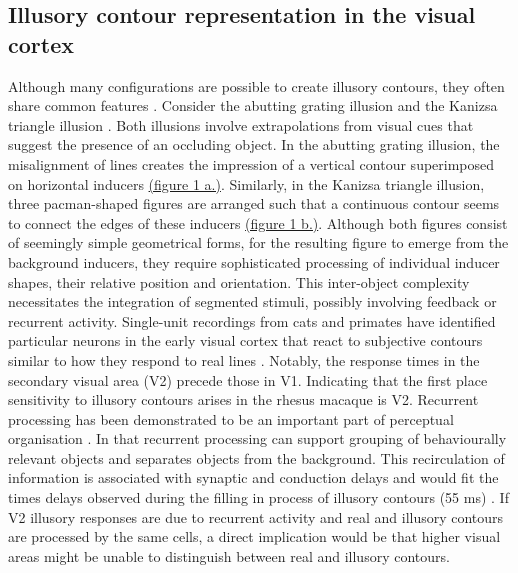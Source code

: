 \documentclass[12pt]{article}
\begin{document}
\subsection{Illusory contour representation in the visual cortex}
Although many configurations are possible to create illusory contours, they often share common features \autocite{palmerLateInfluencesPerceptual2000}. Consider the abutting grating illusion \autocite{sorianoAbuttingGratingIllusion1996} and the Kanizsa triangle illusion \autocite{kanizsaSubjectiveContours1976}. Both illusions involve extrapolations from visual cues that suggest the presence of an occluding object. In the abutting grating illusion, the misalignment of lines creates the impression of a vertical contour superimposed on horizontal inducers \hyperref[fig:figure_1]{(figure 1 a.)}. Similarly, in the Kanizsa triangle illusion, three pacman-shaped figures are arranged such that a continuous contour seems to connect the edges of these inducers \hyperref[fig:figure_1]{(figure 1 b.)}. Although both figures consist of seemingly simple geometrical forms, for the resulting figure to emerge from the background inducers, they require sophisticated processing of individual inducer shapes, their relative position and orientation. This inter-object complexity necessitates the integration of segmented stimuli, possibly involving feedback or recurrent activity. Single-unit recordings from cats and primates have identified particular neurons in the early visual cortex that react to subjective contours similar to how they respond to real lines \autocite{leeDynamicsSubjectiveContour2001,vonderheydtMechanismsContourPerception1989}. Notably, the response times in the secondary visual area (V2) precede those in V1. Indicating that the first place sensitivity to illusory contours arises in the rhesus macaque is V2. Recurrent processing has been demonstrated to be an important part of perceptual organisation \autocite{roelfsemaCORTICALALGORITHMSPERCEPTUAL2006}. In that recurrent processing can support grouping of behaviourally relevant objects and separates objects from the background. This recirculation of information is associated with synaptic and conduction delays and would fit the times delays observed during the filling in process of illusory contours (55 ms) \autocite{leeDynamicsSubjectiveContour2001,pakTopDownFeedbackControls2020}. If V2 illusory responses are due to recurrent activity and real and illusory contours are processed by the same cells, a direct implication would be that higher visual areas might be unable to distinguish between real and illusory contours.
\end{document}
